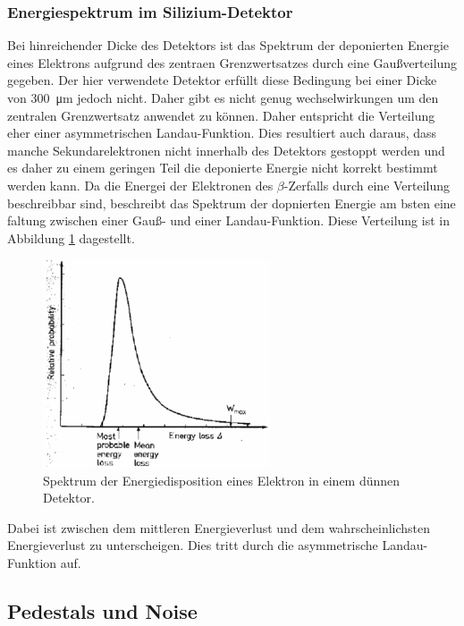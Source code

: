 \subsubsection{Energiespektrum im Silizium-Detektor}
Bei hinreichender Dicke des Detektors ist das Spektrum der deponierten Energie eines
Elektrons aufgrund des zentraen Grenzwertsatzes durch eine Gaußverteilung gegeben.
Der hier verwendete Detektor erfüllt diese Bedingung bei einer Dicke von
\SI{300}{\micro\meter} jedoch nicht. Daher gibt es nicht genug wechselwirkungen
um den zentralen Grenzwertsatz anwendet zu können. Daher entspricht die Verteilung
eher einer asymmetrischen Landau-Funktion. Dies resultiert auch daraus, dass manche
Sekundarelektronen nicht innerhalb des Detektors gestoppt werden und es daher zu
einem geringen Teil die deponierte Energie nicht korrekt bestimmt werden kann.
Da die Energei der Elektronen des $\beta$-Zerfalls durch eine Verteilung beschreibbar
sind, beschreibt das Spektrum der dopnierten Energie am bsten eine faltung zwischen
einer Gauß- und einer Landau-Funktion. Diese Verteilung ist in Abbildung \ref{fig:faltung}
dagestellt.
\begin{figure}[htb]
  \centering
  \includegraphics[width=0.6\textwidth]{images/Landau.png}
  \caption{Spektrum der Energiedisposition eines Elektron in einem dünnen Detektor. \cite{anleitung}}
  \label{fig:faltung}
\end{figure}

Dabei ist zwischen dem mittleren Energieverlust und dem wahrscheinlichsten Energieverlust
zu unterscheigen. Dies tritt durch die asymmetrische Landau-Funktion auf.


\subsection{Pedestals und Noise}
\label{sec:Theorie_Noise}


